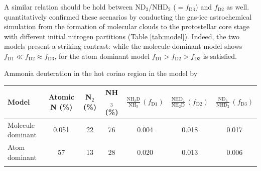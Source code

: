 \documentclass[12pt,a4paper]{article}  %
\begin{document}
A similar relation should be hold between ND$_3$/NHD$_2$ ($=f_\mathrm{D3}$) and $f_\mathrm{D2}$ as well. \citet{Furuya18} quantitatively confirmed these scenarios by conducting the gas-ice astrochemical simulation from the formation of molecular clouds to the protostellar core stage with different initial nitrogen partitions (Table \ref{tab:model}). Indeed, the two models present a striking contrast: while the molecule dominant model shows $f_\mathrm{D1} \ll f_\mathrm{D2} \approx f_\mathrm{D3}$, for the atom dominant model $f_\mathrm{D1} > f_\mathrm{D2} > f_\mathrm{D3}$ is satisfied.

\vspace{-1.2em}
\begin{center}
\begin{threeparttable}[tbh]
\caption[]{Ammonia deuteration in the hot corino region in the model by \citet{Furuya18}}
\begin{tabular}{lcccccc}
\hline \noalign {\smallskip}
Model  & Atomic N (\%) & N$_2$ (\%) & NH$_3$ (\%) & $\frac{\mathrm{NH_2D}}{\mathrm{NH_3}}\,(f_\mathrm{D1})$ & $\frac{\mathrm{NHD_2}}{\mathrm{NH_2D}}\,(f_\mathrm{D2})$ &
$\frac{\mathrm{ND_3}}{\mathrm{NHD_2}}\,(f_\mathrm{D3})$\\
\hline \noalign {\smallskip}
Molecule dominant & 0.051 & 22 & 76 & 0.004 & 0.018 & 0.017 \\
Atom dominant & 57 & 13 & 28 & 0.020 & 0.013 & 0.006 \\
\hline \noalign {\smallskip}
\end{tabular}
\label{tab:model}
\end{threeparttable}
\end{center}
\vspace{-0.5em}


\end{document}
